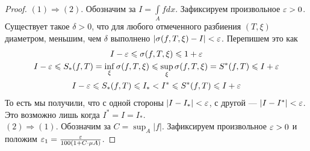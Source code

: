\begin{proof}
    $(1) \Rightarrow (2)$. Обозначим за $I = \int\limits_A fdx$. Зафиксируем произвольное $\varepsilon > 0$. Существует такое $\delta > 0$, что для любого отмеченного разбиения $(T, \xi)$ диаметром, меньшим, чем $\delta$ выполнено $|\sigma(f, T, \xi) - I| < \varepsilon$. Перепишем это как
    \begin{gather}
        I - \varepsilon \leqslant \sigma(f, T, \xi) \leqslant 1 + \varepsilon\\
        I - \varepsilon \leqslant S_*(f, T) = \inf_\xi \sigma(f, T, \xi) \leqslant \sup_\xi \sigma(f, T, \xi) = S^*(f, T) \leqslant I +\varepsilon\\
        I - \varepsilon \leqslant S_*(f, T) \leqslant I_* < I^* \leqslant S^*(f, T) \leqslant I + \varepsilon
    \end{gather}
    То есть мы получили, что с одной стороны $|I - I_*| < \varepsilon$, с другой --- $|I - I^*| < \varepsilon$. Это возможно лишь когда $I^* = I = I_*$.\\
    $(2) \Rightarrow (1)$. Обозначим за $C = \sup_A |f|$. Зафиксируем произвольное $\varepsilon > 0$ и положим $\varepsilon_1 = \frac{\varepsilon}{100(1 + C\cdot\mu A)}$.


\end{proof}
